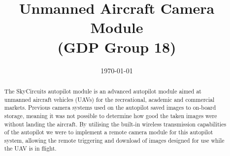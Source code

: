\documentclass[oneside]{ecsgdp}         %
\begin{document}
\frontmatter
\title      {Unmanned Aircraft Camera Module \\(GDP Group 18)}
\date       {\today}
\subject    {ELEC6050 Group Design Project}
\maketitle
\begin{abstract}
The SkyCircuits autopilot module is an advanced autopilot module aimed at unmanned aircraft vehicles (UAVs) for the recreational, academic and commercial markets. Previous camera systems used on the autopilot saved images to on-board storage, meaning it was not possible to determine how good the taken images were without landing the aircraft. By utilising the built-in wireless transmission capabilities of the autopilot we were to implement a remote camera module for this autopilot system, allowing the remote triggering and download of images designed for use while the UAV is in flight.

\end{abstract}
\tableofcontents
\listoffigures
\listoftables
\lstlistoflistings
{}
\mainmatter



\newpage

\newpage

\newpage

\newpage

\newpage
%

\newpage

\newpage

\newpage
%

\newpage

\newpage

\newpage

\newpage
\end{document}
